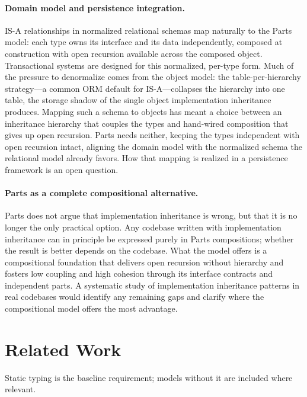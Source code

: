 \documentclass[acmsmall,nonacm]{acmart}
\theoremstyle{acmplain}
\theoremstyle{acmdefinition}
\begin{document}
\paragraph{Domain model and persistence integration.}
IS-A relationships in normalized relational schemas map naturally to the
Parts model: each type owns its interface and its data independently,
composed at construction with open recursion available across the composed
object. Transactional systems are designed for this normalized, per-type
form. Much of the pressure to denormalize comes from the object model: the
table-per-hierarchy strategy---a common ORM default for IS-A---collapses the
hierarchy into one table, the storage shadow of the single object
implementation inheritance produces. Mapping such a schema to objects has
meant a choice between an inheritance hierarchy that couples the types and
hand-wired composition that gives up open recursion. Parts needs neither,
keeping the types independent with open recursion intact, aligning the domain
model with the normalized schema the relational model already favors. How that
mapping is realized in a persistence framework is an open question.

\paragraph{Parts as a complete compositional alternative.}
Parts does not argue that implementation inheritance is wrong, but that
it is no longer the only practical option. Any codebase written with
implementation inheritance can in principle be expressed purely in Parts
compositions; whether the result is better depends on the codebase. What
the model offers is a compositional foundation that delivers open recursion
without hierarchy and fosters low coupling and high cohesion through its
interface contracts and independent parts. A systematic study of implementation
inheritance patterns in real codebases would identify any remaining gaps
and clarify where the compositional model offers the most advantage.

\section{Related Work}
\label{sec:related}

Static typing is the baseline requirement; models without it are included where relevant.
\end{document}

